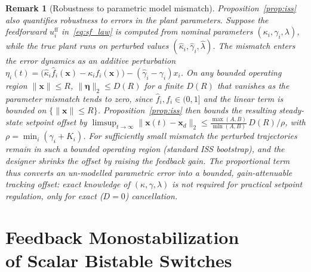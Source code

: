 \documentclass[12pt]{article}
\newtheorem{remark}{Remark}
\begin{document}
\begin{remark}[Robustness to parametric model mismatch]
\label{rem:robustness}
Proposition~\ref{prop:iss} also quantifies robustness to errors in the
plant parameters. Suppose the feedforward $u_i^{\mathrm{ff}}$
in~\eqref{eq:sf_law} is computed from nominal parameters
$(\kappa_i,\gamma_i,\lambda)$, while the true plant runs on perturbed
values $(\hat\kappa_i,\hat\gamma_i,\hat\lambda)$. The mismatch enters
the error dynamics as an additive perturbation
$\eta_i(t)=\bigl(\hat\kappa_i\hat f_i(\mathbf{x})-\kappa_i f_i(\mathbf{x})\bigr)
-(\hat\gamma_i-\gamma_i)x_i$. On any bounded operating region $\|\mathbf{x}\|\le R$,
$\|\boldsymbol{\eta}\|_2\le D(R)$ for a finite $D(R)$ that vanishes as the
parameter mismatch tends to zero, since $\hat f_i,f_i\in(0,1]$ and the
linear term is bounded on $\{\|\mathbf{x}\|\le R\}$.
Proposition~\ref{prop:iss} then bounds the resulting steady-state
setpoint offset by
$\limsup_{t\to\infty}\|\mathbf{x}(t)-\mathbf{x}_d\|_2\le
\tfrac{\max(A,B)}{\min(A,B)}\,D(R)/\rho$, with $\rho=\min_i(\gamma_i+K_i)$.
For sufficiently small mismatch the perturbed trajectories remain in such
a bounded operating region (standard ISS bootstrap), and the designer
shrinks the offset by raising the feedback gain. The proportional term
thus converts an un-modelled parametric error into a bounded,
gain-attenuable tracking offset: exact knowledge of
$(\kappa,\gamma,\lambda)$ is not required for practical setpoint
regulation, only for exact ($D=0$) cancellation.
\end{remark}

\section[Feedback Monostabilization of Bistable Switches]{Feedback Monostabilization\texorpdfstring{\\}{ }%
  of Scalar Bistable Switches}
\label{sec:monostab}
\end{document}
